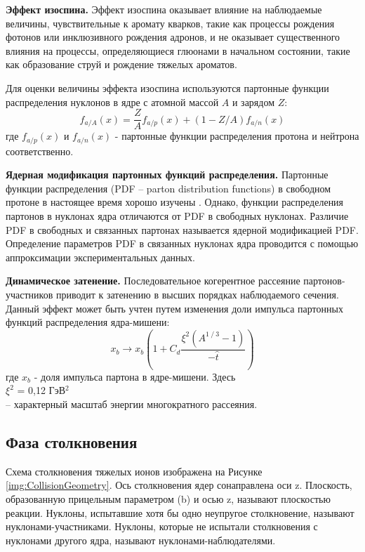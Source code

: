 \textbf{Эффект изоспина.}
Эффект изоспина оказывает влияние на наблюдаемые величины, чувствительные к аромату кварков, такие как процессы рождения фотонов или инклюзивного рождения адронов, и не оказывает существенного влияния на процессы, определяющиеся глюонами в начальном состоянии, такие как образование струй и рождение тяжелых ароматов. 

Для оценки величины эффекта изоспина используются партонные функции распределения нуклонов в ядре с атомной массой $A$ и зарядом $Z$:
$$f_{a/A}(x) = \frac{Z}{A}f_{a/p}(x)+\left(1-Z/A \right) f_{a/n}(x)$$
где $f_{a/p}(x)$ и $f_{a/n}(x)$ - партонные функции распределения протона и нейтрона соответственно. 

\textbf{Ядерная модификация партонных функций распределения.}
Партонные функции распределения (PDF -- parton distribution functions) в свободном протоне в настоящее время хорошо изучены \cite{PDF1, PDF2, PDF3}.
Однако, функции распределения партонов в нуклонах ядра отличаются от PDF в свободных нуклонах. Различие PDF в свободных и связанных партонах называется ядерной модификацией PDF. 
Определение параметров PDF в связанных нуклонах ядра проводится с помощью аппроксимации экспериментальных данных.

\textbf{Динамическое затенение.}
Последовательное когерентное рассеяние партонов-участников приводит к затенению в высших порядках наблюдаемого сечения. Данный эффект может быть учтен путем изменения доли импульса партонных функций распределения ядра-мишени:
$$x_b \rightarrow x_b \left(1+C_d  \frac{\xi^2 (A^{1⁄3}-1)}{-\hat{t}} \right)$$
где $x_b$ - доля импульса партона в ядре-мишени. Здесь \\
$\xi ^2$ = 0,12 ГэВ$^2$ \\
– характерный масштаб энергии многократного рассеяния. 


\subsection{Фаза столкновения} 
Схема столкновения тяжелых ионов изображена на Рисунке \ref{img:CollisionGeometry}. Ось столкновения ядер сонаправлена оси z. Плоскость, образованную прицельным параметром (b) и осью z, называют плоскостью реакции.  
Нуклоны, испытавшие хотя бы одно неупругое столкновение, называют нуклонами-участниками. Нуклоны, которые не испытали столкновения с нуклонами другого ядра, называют нуклонами-наблюдателями.

